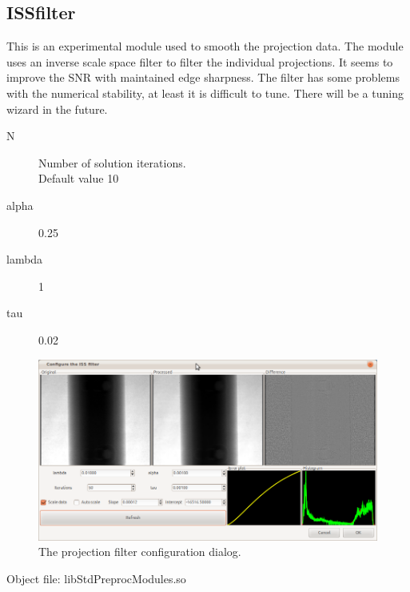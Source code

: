 \documentclass[a4paper]{scrreprt}
\begin{document}
\subsection{ISSfilter}
This is an experimental module used to smooth the projection data. The module uses an inverse scale space filter \cite{burger2006}
to filter the individual projections.
It seems to improve the SNR with maintained edge sharpness. The filter has some problems with the
numerical stability, at least it is difficult to tune. There will be a tuning wizard in the
future.
\begin{description}
 \item[N] Number of solution iterations. \\ Default value 10
 \item[alpha]0.25
 \item[lambda]1
 \item[tau]0.02
\end{description}
\begin{figure}[ht!]
\centering
\includegraphics[scale=0.5]{figures/ConfISS.png}
\caption{The projection filter configuration dialog.}
\end{figure}
Object file: libStdPreprocModules.so
\end{document}
